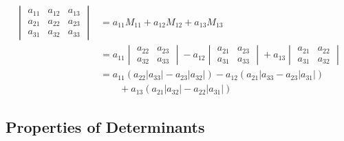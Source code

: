 \documentclass{article}
\begin{document}
\begin{itemize}
        \begin{align*}
          \begin{vmatrix}
            a_{11} & a_{12} & a_{13} \\
            a_{21} & a_{22} & a_{23} \\
            a_{31} & a_{32} & a_{33}
          \end{vmatrix} & = a_{11} M_{11} + a_{12} M_{12} + a_{13} M_{13}                                                        \\
                                      & = a_{11} \begin{vmatrix}
                                                   a_{22} & a_{23} \\
                                                   a_{32} & a_{33}
                                                 \end{vmatrix} - a_{12} \begin{vmatrix}
                                                                          a_{21} & a_{23} \\
                                                                          a_{31} & a_{33}
                                                                        \end{vmatrix} + a_{13} \begin{vmatrix}
                                                                                                 a_{21} & a_{22} \\
                                                                                                 a_{31} & a_{32}
                                                                                               \end{vmatrix}                   \\
                                      & = a_{11} (a_{22} |a_{33}| - a_{23} |a_{32}|) - a_{12} (a_{21} |a_{33} - a_{23} |a_{31}|) \\
                                      & \qquad + a_{13} (a_{21} |a_{32}| - a_{22} |a_{31}|)
        \end{align*}
\end{itemize}

\subsection{Properties of Determinants}
\end{document}
